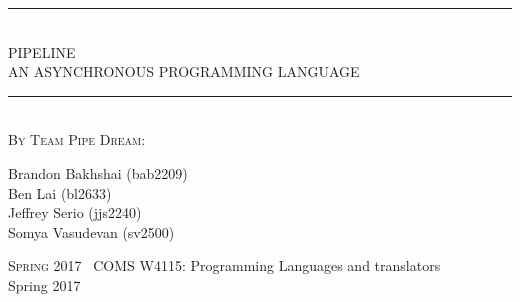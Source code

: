 \documentclass[./Report_main.tex]{subfiles}
\begin{document}
  \begin{titlepage}
    \textheight
    \centering
    \vspace*{\baselineskip}
    \rule{\textwidth}{3pt}\\[\baselineskip]
    {\Huge PIPELINE \\[0.3\baselineskip] AN ASYNCHRONOUS PROGRAMMING LANGUAGE}\\[0.2\baselineskip]
    \rule{\textwidth}{3pt}\\[\baselineskip]
    \scshape
    \vspace*{2\baselineskip}
    By Team Pipe Dream: \\ %
    {\Large Brandon Bakhshai (bab2209) \\ Ben Lai (bl2633) \\ 
    Jeffrey Serio (jjs2240) \\ Somya Vasudevan (sv2500) \par}
    \vfill
    {\scshape Spring 2017} \ {\large COMS W4115: Programming Languages and translators
                                     \\ Spring 2017}\par
  \end{titlepage}
  
\end{document}
